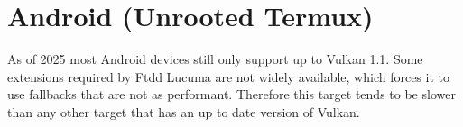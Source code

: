 \documentclass[../../main.tex]{subfiles}
\begin{document}
\section{Android (Unrooted Termux)}
As of 2025 most Android devices still only support up to Vulkan 1.1\cite{android_vulkan}.
Some extensions required by Ftdd Lucuma are not widely available, which forces it to use fallbacks that are not as performant.
Therefore this target tends to be slower than any other target that has an up to date version of Vulkan.
\inputminted[bgcolor=codeBg, tabsize=4, breaklines=true, linenos=true]{bash}{\subfix{build-termux.sh}}
\end{document}
